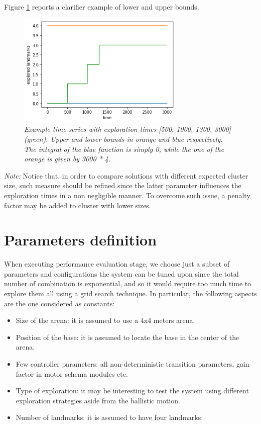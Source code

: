 \noindent 
Figure \ref{fig:auc} reports a clarifier example of lower and upper bounds.  

\begin{figure}[H]
\centering
\includegraphics[width=8cm, keepaspectratio]{images/auc.png}
\caption{\textit{Example time series with exploration times [500, 1000, 1300, 3000] (green). Upper and lower bounds in orange and blue respectively. The integral of the blue function is simply 0, while the one of the orange is given by 3000 * 4.}}
\label{fig:auc}
\end{figure}

\noindent
\textit{Note:} Notice that, in order to compare solutions with different expected cluster size, such measure should be refined  since the latter parameter influences the exploration times in a non negligible manner. To overcome such issue, a penalty factor may be added to cluster with lower sizes. 

\section{Parameters definition}

When executing performance evaluation stage, we choose just a subset of parameters and configurations the system can be tuned upon since the total number of combination is exponential, and so it would require too much time to explore them all using a grid search technique. In particular, the following aspects are the one considered as constants:

\begin{itemize}

  \item Size of the arena: it is assumed to use a 4x4 meters arena.
  \item Position of the base: it is assumed to locate the base in the center of the arena.
  \item Few controller parameters: all non-deterministic transition parameters, gain factor in motor schema modules etc.
  \item Type of exploration: it may be interesting to test the system using different exploration strategies aside from the ballistic motion.
  \item Number of landmarks: it is assumed to have four landmarks  

\end{itemize} 

